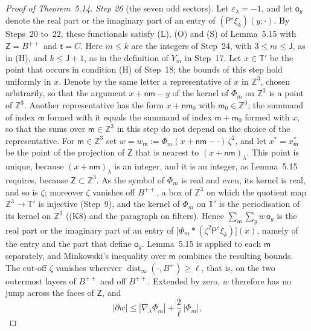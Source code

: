 \documentclass[11pt]{amsart}
\theoremstyle{definition}
\begin{document}
\begin{proof}[Proof of Theorem~5.14]
\emph{Step 26} (the seven odd sectors).
Let $\varepsilon_\lambda=-1$, and let $\mathsf o_y$ denote the real part or the imaginary part of an entry of $(\mathsf P^\varepsilon\xi_k)(y;\cdot)$.
By Steps~20 to~22, these functionals satisfy (L), (O) and (S) of Lemma~5.15 with $\mathsf Z=B^{++}$ and $\mathsf t=C$.
Here $m\le k$ are the integers of Step~24, with $3\le m\le\mathsf J$, as in (H), and $k\le\mathsf J+1$, as in the definition of $Y_m$ in Step~17.
Let $x\in\mathbb T'$ be the point that occurs in condition (H) of Step~18; the bounds of this step hold uniformly in $x$.
Denote by the same letter a representative of $x$ in $\mathbb Z^3$, chosen arbitrarily, so that the argument $x+\mathsf n\mathsf m-y$ of the kernel of $\Phi_m$ on $\mathbb Z^3$ is a point of $\mathbb Z^3$.
Another representative has the form $x+\mathsf n\mathsf m_0$ with $\mathsf m_0\in\mathbb Z^3$; the summand of index $\mathsf m$ formed with it equals the summand of index $\mathsf m+\mathsf m_0$ formed with $x$, so that the sums over $\mathsf m\in\mathbb Z^3$ in this step do not depend on the choice of the representative.
For $\mathsf m\in\mathbb Z^3$ set $w=w_{\mathsf m}:=\Phi_m(x+\mathsf n\mathsf m-\cdot)\,\zeta^2$, and let $x^*=x^*_{\mathsf m}$ be the point of the projection of $\mathsf Z$ that is nearest to $(x+\mathsf n\mathsf m)_\lambda$.
This point is unique, because $(x+\mathsf n\mathsf m)_\lambda$ is an integer, and it is an integer, as Lemma~5.15 requires, because $\mathsf Z\subset\mathbb Z^3$.
As the symbol of $\Phi_m$ is real and even, its kernel is real, and so is $\zeta$; moreover $\zeta$ vanishes off $B^{++}$, a box of $\mathbb Z^3$ on which the quotient map $\mathbb Z^3\to\mathbb T'$ is injective (Step~9), and the kernel of $\Phi_m$ on $\mathbb T'$ is the periodisation of its kernel on $\mathbb Z^3$ ((K8) and the paragraph on filters).
Hence $\sum_{\mathsf m}\sum_yw\,\mathsf o_y$ is the real part or the imaginary part of an entry of $\bigl[\Phi_m*(\zeta^2\mathsf P^\varepsilon\xi_k)\bigr](x)$, namely of the entry and the part that define $\mathsf o_y$.
Lemma~5.15 is applied to each $\mathsf m$ separately, and Minkowski's inequality over $\mathsf m$ combines the resulting bounds.
The cut-off $\zeta$ vanishes wherever $\operatorname{dist}_\infty(\cdot,B^+)\ge\ell$, that is, on the two outermost layers of $B^{++}$ and off $B^{++}$.
Extended by zero, $w$ therefore has no jump across the faces of $\mathsf Z$, and
\begin{equation*}
|\partial w|\le|\nabla_\lambda\Phi_m|+\frac2\ell\,|\Phi_m|,
\end{equation*}

\end{proof}
\end{document}
